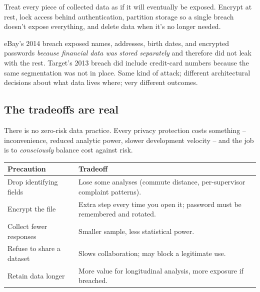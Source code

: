 \documentclass[11pt]{article}
\begin{document}
\begin{defnbox}
Treat every piece of collected data as if it will eventually be
exposed. Encrypt at rest, lock access behind authentication, partition
storage so a single breach doesn't expose everything, and delete data
when it's no longer needed.
\end{defnbox}

\begin{notebox}
eBay's 2014 breach exposed names, addresses, birth dates, and
encrypted passwords \emph{because financial data was stored
separately} and therefore did not leak with the rest. Target's 2013
breach did include credit-card numbers because the same segmentation
was not in place. Same kind of attack; different architectural
decisions about what data lives where; very different outcomes.
\end{notebox}

\subsection{The tradeoffs are real}

There is no zero-risk data practice. Every privacy protection costs
something -- inconvenience, reduced analytic power, slower development
velocity -- and the job is to \emph{consciously} balance cost against
risk.

\begin{center}
\small
\begin{tabular}{p{4.8cm} p{7.2cm}}
\textbf{Precaution} & \textbf{Tradeoff} \\
\hline
Drop identifying fields & Lose some analyses (commute distance,
per-supervisor complaint patterns). \\
Encrypt the file & Extra step every time you open it; password must
be remembered and rotated. \\
Collect fewer responses & Smaller sample, less statistical power. \\
Refuse to share a dataset & Slows collaboration; may block a
legitimate use. \\
Retain data longer & More value for longitudinal analysis, more
exposure if breached. \\
\end{tabular}
\normalsize
\end{center}
\end{document}
